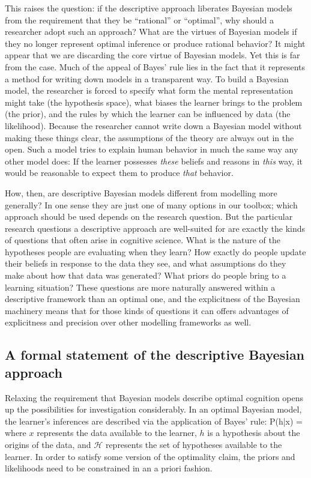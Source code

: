 This raises the question: if the descriptive approach liberates Bayesian models from the requirement that they be ``rational'' or ``optimal'', why should a researcher adopt such an approach? What are the virtues of Bayesian models if they no longer represent optimal inference or produce rational behavior? It might appear that we are discarding the core virtue of Bayesian models. Yet this is far from the case. Much of the appeal of Bayes' rule lies in the fact that it represents a method for writing down models in a transparent way. To build a Bayesian model, the researcher is forced to specify what form the mental representation might take (the hypothesis space), what biases the learner brings to the problem (the prior), and the rules by which the learner can be influenced by data (the likelihood). Because the researcher cannot write down a Bayesian model without making these things clear, the assumptions of the theory are always out in the open. Such a model tries to explain human behavior in much the same way any other model does: If the learner possesses {\it these} beliefs and reasons in {\it this} way, it would be reasonable to expect them to produce {\it that} behavior. 

How, then, are descriptive Bayesian models different from modelling more generally? In one sense they are just one of many options in our toolbox; which approach should be used depends on the research question. But the particular research questions a descriptive approach are well-suited for are exactly the kinds of questions that often arise in cognitive science. What is the nature of the hypotheses people are evaluating when they learn? How exactly do people update their beliefs in response to the data they see, and what assumptions do they make about how that data was generated? What priors do people bring to a learning situation? These questions are more naturally answered within a descriptive framework than an optimal one, and the explicitness of the Bayesian machinery means that for those kinds of questions it can offers advantages of explicitness and precision over other modelling frameworks as well. 



\subsection*{A formal statement of the descriptive Bayesian approach}

Relaxing the requirement that Bayesian models describe optimal cognition opens up the possibilities for investigation considerably. In an optimal Bayesian model, the learner's inferences are described via the application of Bayes' rule:
\be
P(h|x) = 
\label{eq:obmc}
\ee
where $x$ represents the data available to the learner, $h$ is a hypothesis about the origins of the data, and $\mathcal{H}$ represents the set of hypotheses available to the learner. In order to satisfy some version of the optimality claim, the priors and likelihoods need to be constrained in an a priori fashion.

